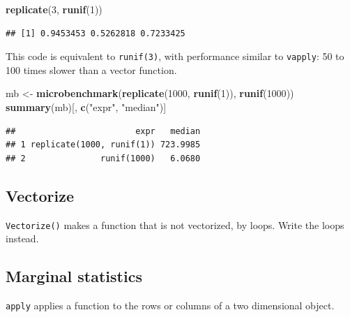 \documentclass[
  12pt,
  american,
  a4paper,
  extrafontsizes,onecolumn,openright
  ]{memoir}
\newenvironment{Shaded}{\begin{snugshade}}{\end{snugshade}}
\newcommand{\DecValTok}[1]{\textcolor[rgb]{0.00,0.00,0.81}{#1}}
\newcommand{\FunctionTok}[1]{\textcolor[rgb]{0.13,0.29,0.53}{\textbf{#1}}}
\newcommand{\NormalTok}[1]{#1}
\newcommand{\OtherTok}[1]{\textcolor[rgb]{0.56,0.35,0.01}{#1}}
\newcommand{\StringTok}[1]{\textcolor[rgb]{0.31,0.60,0.02}{#1}}
\newlength{\rf}
\begin{document}
\scriptsize

\begin{Shaded}
\begin{Highlighting}[]
\FunctionTok{replicate}\NormalTok{(}\DecValTok{3}\NormalTok{, }\FunctionTok{runif}\NormalTok{(}\DecValTok{1}\NormalTok{))}
\end{Highlighting}
\end{Shaded}

\begin{verbatim}
## [1] 0.9453453 0.5262818 0.7233425
\end{verbatim}

\normalsize

This code is equivalent to \texttt{runif(3)}, with performance similar to \texttt{vapply}: 50 to 100 times slower than a vector function.

\scriptsize

\begin{Shaded}
\begin{Highlighting}[]
\NormalTok{mb }\OtherTok{\textless{}{-}} \FunctionTok{microbenchmark}\NormalTok{(}\FunctionTok{replicate}\NormalTok{(}\DecValTok{1000}\NormalTok{, }\FunctionTok{runif}\NormalTok{(}\DecValTok{1}\NormalTok{)), }\FunctionTok{runif}\NormalTok{(}\DecValTok{1000}\NormalTok{))}
\FunctionTok{summary}\NormalTok{(mb)[, }\FunctionTok{c}\NormalTok{(}\StringTok{"expr"}\NormalTok{, }\StringTok{"median"}\NormalTok{)]}
\end{Highlighting}
\end{Shaded}

\begin{verbatim}
##                        expr   median
## 1 replicate(1000, runif(1)) 723.9985
## 2               runif(1000)   6.0680
\end{verbatim}

\normalsize

\subsection{Vectorize}\label{vectorize}

\texttt{Vectorize()} makes a function that is not vectorized, by loops.
Write the loops instead.

\subsection{Marginal statistics}\label{marginal-statistics}

\texttt{apply} applies a function to the rows or columns of a two dimensional object.
\end{document}
